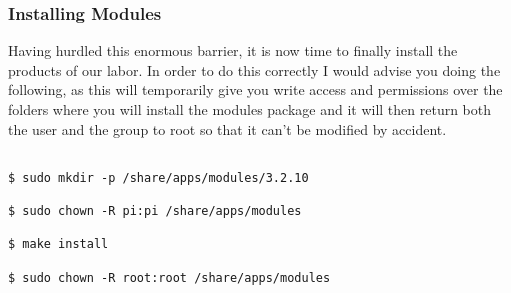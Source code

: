\documentclass[]{article}
\begin{document}
                                                                                                                    \subsubsection{Installing Modules}
                                                                                                                    Having hurdled this enormous barrier, it is now time to finally install the products of our labor. In order 
                                                                                                                    to do this correctly I would advise you doing the following, as this will temporarily give you write access and permissions over the
                                                                                                                    folders where you will install the modules package and it will then return both the user and the group to root so that it can't be
                                                                                                                    modified by accident.
                                                                                                                    \begin{lstlisting}
                                                                                                                    $ sudo mkdir -p /share/apps/modules/3.2.10
                                                                                                                    $ sudo chown -R pi:pi /share/apps/modules
                                                                                                                    $ make install
                                                                                                                    $ sudo chown -R root:root /share/apps/modules
                                                                                                                    \end{lstlisting}
\end{document}
